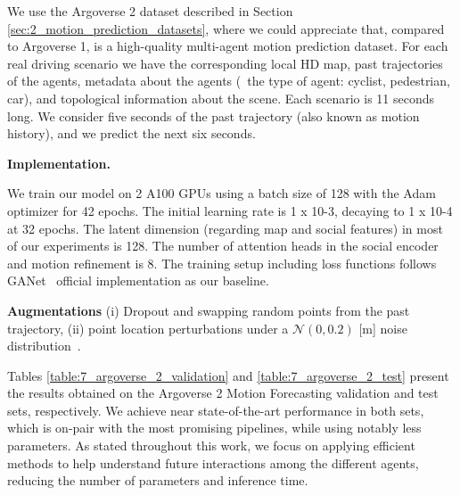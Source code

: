 We use the Argoverse 2 \cite{wilson2023argoverse} dataset described in Section \ref{sec:2_motion_prediction_datasets}, where we could appreciate that, compared to Argoverse 1, is a high-quality multi-agent motion prediction dataset. For each real driving scenario we have the corresponding local HD map, past trajectories of the agents, metadata about the agents (\eg \ the type of agent: cyclist, pedestrian, car), and topological information about the scene. Each scenario is 11 seconds long. We consider five seconds of the past trajectory (also known as motion history), and we predict the next six seconds. 


\noindent\textbf{Implementation.}

We train our model on 2 A100 GPUs using a batch size of 128 with the Adam optimizer for 42 epochs. The initial learning rate is 1 x 10-3, decaying to 1 x 10-4 at 32 epochs. The latent dimension (regarding map and social features) in most of our experiments is 128. The number of attention heads in the social encoder and motion refinement is 8. The training setup including loss functions follows GANet~\cite{wang2022ganet} official implementation as our baseline.

\noindent\textbf{Augmentations}  (i) Dropout and swapping random points from the past trajectory, (ii) point location perturbations under a $\mathcal{N}(0, 0.2)$ [m] noise distribution~\cite{ye2021tpcn}.

Tables \ref{table:7_argoverse_2_validation} and \ref{table:7_argoverse_2_test} present the results obtained on the Argoverse 2 Motion Forecasting validation and test sets, respectively. We achieve near state-of-the-art performance in both sets, which is on-pair with the most promising pipelines, while using notably less parameters. As stated throughout this work, we focus on applying efficient methods to help understand future interactions among the different agents, reducing the number of parameters and inference time. 

